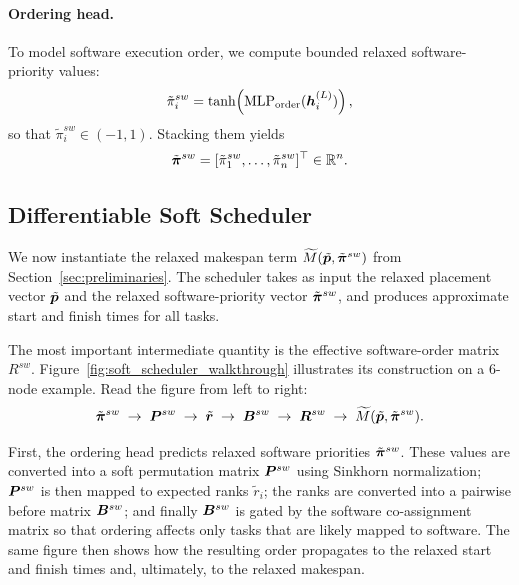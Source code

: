 \paragraph{\textbf{Ordering head.}}
To model software execution order, we compute bounded relaxed software-priority values:
\begin{equation}
\tilde{\pi}_i^{sw} = \tanh\!\left(\mathrm{MLP}_{\mathrm{order}}({\bm{h}}_i^{(L)})\right),
\end{equation}
so that $\tilde{\pi}_i^{sw}\in(-1,1)$. Stacking them yields
\begin{equation}
\tilde{\bm{\pi}}^{sw} = [\tilde{\pi}_1^{sw},\dots,\tilde{\pi}_n^{sw}]^\top \in \mathbb{R}^n.
\end{equation}


\subsection{Differentiable Soft Scheduler}

We now instantiate the relaxed makespan term $\widetilde{M}(\tilde{{\bm{p}}},\tilde{\bm{\pi}}^{sw})$ from Section~\ref{sec:preliminaries}. The scheduler takes as input the relaxed placement vector $\tilde{{\bm{p}}}$ and the relaxed software-priority vector $\tilde{\bm{\pi}}^{sw}$, and produces approximate start and finish times for all tasks.

The most important intermediate quantity is the effective software-order matrix $R^{sw}$. Figure~\ref{fig:soft_scheduler_walkthrough} illustrates its construction on a 6-node example. Read the figure from left to right:
\[
\tilde{\bm{\pi}}^{sw}
\;\rightarrow\;
{\bm{P}}^{sw}
\;\rightarrow\;
\tilde{{\bm{r}}}
\;\rightarrow\;
{\bm{B}}^{sw}
\;\rightarrow\;
{\bm{R}}^{sw}
\;\rightarrow\;
\widetilde{M}(\tilde{{\bm{p}}},\tilde{\bm{\pi}}^{sw}).
\]

First, the ordering head predicts relaxed software priorities $\tilde{\bm{\pi}}^{sw}$. These values are converted into a soft permutation matrix ${\bm{P}}^{sw}$ using Sinkhorn normalization; ${\bm{P}}^{sw}$ is then mapped to expected ranks $\tilde r_i$; the ranks are converted into a pairwise before matrix ${\bm{B}}^{sw}$; and finally ${\bm{B}}^{sw}$ is gated by the software co-assignment matrix so that ordering affects only tasks that are likely mapped to software. The same figure then shows how the resulting order propagates to the relaxed start and finish times and, ultimately, to the relaxed makespan.

